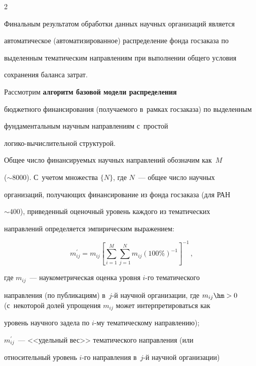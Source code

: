 \begin{multicols}{2}
    

    Финальным результатом обработки данных научных организаций является 

автоматическое (автоматизированное) распределение фонда госзаказа по 

выделенным тематическим на\-прав\-ле\-ни\-ям при выполнении общего условия 

сохранения баланса затрат.

    

    Рассмотрим \textbf{алгоритм базовой модели распределения} 

бюджетного финансирования (получаемого в~рамках госзаказа) по выделенным 

фундаментальным научным на\-прав\-ле\-ни\-ям с~прос\-той  

ло\-ги\-ко-вы\-чис\-ли\-тель\-ной структурой. 

    

    Общее число финансируемых научных на\-прав\-ле\-ний обозначим как~$M$ 

($\sim8000$). С~учетом множества $\{N\}$, где $N$~--- общее число научных 

организаций, получающих финансирование из фонда госзаказа (для РАН 

$\sim400$), приведенный оценочный уровень каждого из тематических 

на\-прав\-ле\-ний определяется эмпирическим выражением:

    \begin{equation*}

    m^\prime_{ij}=m_{ij} \left[ \sum\limits_{i=1}^M \sum\limits_{j=1}^N m_{ij} \left( 

100\%\right)^{-1}\right]^{-1}\,,


    \end{equation*}

где $m_{ij}$~--- наукометрическая оценка уровня $i$-го тематического 

направления (по пуб\-ли\-ка\-ци\-ям) в~$j$-й научной организации, где $m_{ij}\hm> 

0$ (с~некоторой долей упрощения $m_{ij}$ может интерпретироваться как 

уровень научного задела по $i$-му тематическому на\-прав\-ле\-нию); 

$m^\prime_{ij}$~--- <<удельный вес>> тематического на\-прав\-ле\-ния (или 

относительный уровень $i$-го направления в~$j$-й научной организации) 


\end{multicols}
